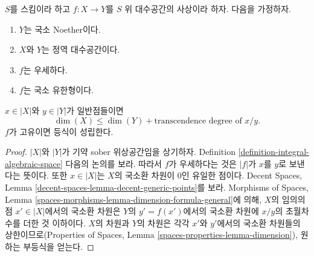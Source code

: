 \begin{lemma}
\label{lemma-alteration-dimension}
$S$를 스킴이라 하고 $f : X \to Y$를 $S$ 위 대수공간의 사상이라 하자.
다음을 가정하자.
\begin{enumerate}
\item $Y$는 국소 Noether이다.
\item $X$와 $Y$는 정역 대수공간이다.
\item $f$는 우세하다.
\item $f$는 국소 유한형이다.
\end{enumerate}
$x \in |X|$와 $y \in |Y|$가 일반점들이면
$$
\dim(X) \leq \dim(Y) + \text{transcendence degree of }x/y.
$$
$f$가 고유이면 등식이 성립한다.
\end{lemma}

\begin{proof}
$|X|$와 $|Y|$가 기약 sober 위상공간임을 상기하자. Definition
\ref{definition-integral-algebraic-space} 다음의 논의를 보라. 따라서 $f$가
우세하다는 것은 $|f|$가 $x$를 $y$로 보낸다는 뜻이다. 또한
$x \in |X|$는 $X$의 국소환 차원이 $0$인 유일한 점이다. Decent Spaces,
Lemma \ref{decent-spaces-lemma-decent-generic-points}를 보라. Morphisms of
Spaces, Lemma \ref{spaces-morphisms-lemma-dimension-formula-general}에 의해,
$X$의 임의의 점 $x' \in |X|$에서의 국소환 차원은 $Y$의
$y' = f(x')$에서의 국소환 차원에 $x/y$의 초월차수를 더한 것 이하이다.
$X$의 차원과 $Y$의 차원은 각각 $x'$와 $y'$에서의 국소환 차원들의
상한이므로(Properties of Spaces, Lemma
\ref{spaces-properties-lemma-dimension}), 원하는 부등식을 얻는다.


\end{proof}

